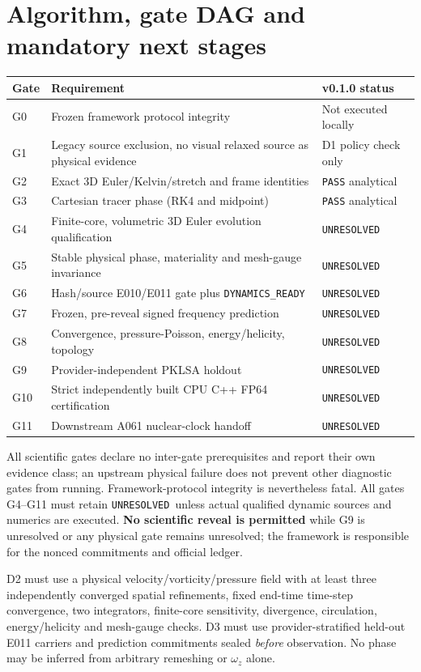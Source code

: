 \documentclass[10pt,a4paper]{article}
\newcommand{\unresolved}{\texttt{UNRESOLVED}}
\begin{document}
\section{Algorithm, gate DAG and mandatory next stages}
\begin{longtable}{p{.085\linewidth}p{.59\linewidth}p{.23\linewidth}}
\toprule Gate & Requirement & v0.1.0 status\\\midrule
G0 & Frozen framework protocol integrity & Not executed locally\\
G1 & Legacy source exclusion, no visual relaxed source as physical evidence & D1 policy check only\\
G2 & Exact 3D Euler/Kelvin/stretch and frame identities & \texttt{PASS} analytical\\
G3 & Cartesian tracer phase (RK4 and midpoint) & \texttt{PASS} analytical\\
G4 & Finite-core, volumetric 3D Euler evolution qualification & \unresolved\\
G5 & Stable physical phase, materiality and mesh-gauge invariance & \unresolved\\
G6 & Hash/source E010/E011 gate plus \texttt{DYNAMICS\_READY} & \unresolved\\
G7 & Frozen, pre-reveal signed frequency prediction & \unresolved\\
G8 & Convergence, pressure-Poisson, energy/helicity, topology & \unresolved\\
G9 & Provider-independent PKLSA holdout & \unresolved\\
G10 & Strict independently built CPU C++ FP64 certification & \unresolved\\
G11 & Downstream A061 nuclear-clock handoff & \unresolved\\\bottomrule
\end{longtable}
All scientific gates declare no inter-gate prerequisites and report their own evidence class; an upstream physical failure does not prevent other diagnostic gates from running. Framework-protocol integrity is nevertheless fatal. All gates G4--G11 must retain \unresolved\ unless actual qualified dynamic sources and numerics are executed. \textbf{No scientific reveal is permitted} while G9 is unresolved or any physical gate remains unresolved; the framework is responsible for the nonced commitments and official ledger.

D2 must use a physical velocity/vorticity/pressure field with at least three independently converged spatial refinements, fixed end-time time-step convergence, two integrators, finite-core sensitivity, divergence, circulation, energy/helicity and mesh-gauge checks. D3 must use provider-stratified held-out E011 carriers and prediction commitments sealed \emph{before} observation. No phase may be inferred from arbitrary remeshing or $\omega_z$ alone.
\end{document}
